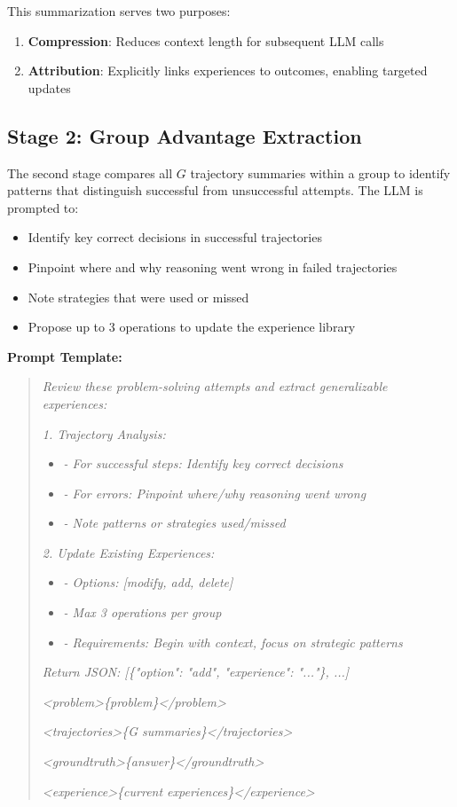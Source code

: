 This summarization serves two purposes:
\begin{enumerate}
    \item \textbf{Compression}: Reduces context length for subsequent LLM calls
    \item \textbf{Attribution}: Explicitly links experiences to outcomes, enabling targeted updates
\end{enumerate}

\subsection{Stage 2: Group Advantage Extraction}

The second stage compares all $G$ trajectory summaries within a group to identify patterns that distinguish successful from unsuccessful attempts. The LLM is prompted to:
\begin{itemize}
    \item Identify key correct decisions in successful trajectories
    \item Pinpoint where and why reasoning went wrong in failed trajectories
    \item Note strategies that were used or missed
    \item Propose up to 3 operations to update the experience library
\end{itemize}

\textbf{Prompt Template:}
\begin{quote}
\small
\textit{Review these problem-solving attempts and extract generalizable experiences:}

\textit{1. Trajectory Analysis:}
\begin{itemize}
    \item[] \textit{- For successful steps: Identify key correct decisions}
    \item[] \textit{- For errors: Pinpoint where/why reasoning went wrong}
    \item[] \textit{- Note patterns or strategies used/missed}
\end{itemize}

\textit{2. Update Existing Experiences:}
\begin{itemize}
    \item[] \textit{- Options: [modify, add, delete]}
    \item[] \textit{- Max 3 operations per group}
    \item[] \textit{- Requirements: Begin with context, focus on strategic patterns}
\end{itemize}

\textit{Return JSON: [\{"option": "add", "experience": "..."\}, ...]}

\textit{<problem>\{problem\}</problem>}

\textit{<trajectories>\{G summaries\}</trajectories>}

\textit{<groundtruth>\{answer\}</groundtruth>}

\textit{<experience>\{current experiences\}</experience>}
\end{quote}

